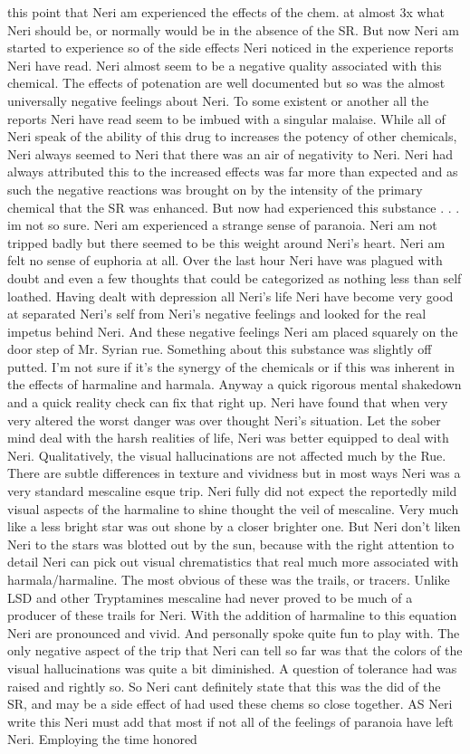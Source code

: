 \documentclass[12pt]{book}
\begin{document}
this point that Neri am experienced the effects of the chem. at almost 3x what Neri should be, or normally would be in the absence of the SR. But now Neri am started to experience so of the side effects Neri noticed in the experience reports Neri have read. Neri almost seem to be a negative quality associated with this chemical. The effects of potenation are well documented but so was the almost universally negative feelings about Neri. To some existent or another all the reports Neri have read seem to be imbued with a singular malaise. While all of Neri speak of the ability of this drug to increases the potency of other chemicals, Neri always seemed to Neri that there was an air of negativity to Neri. Neri had always attributed this to the increased effects was far more than expected and as such the negative reactions was brought on by the intensity of the primary chemical that the SR was enhanced. But now had experienced this substance . . .  im not so sure. Neri am experienced a strange sense of paranoia. Neri am not tripped badly but there seemed to be this weight around Neri's heart. Neri am felt no sense of euphoria at all. Over the last hour Neri have was plagued with doubt and even a few thoughts that could be categorized as nothing less than self loathed. Having dealt with depression all Neri's life Neri have become very good at separated Neri's self from Neri's negative feelings and looked for the real impetus behind Neri. And these negative feelings Neri am placed squarely on the door step of Mr. Syrian rue. Something about this substance was slightly off putted. I'm not sure if it's the synergy of the chemicals or if this was inherent in the effects of harmaline and harmala. Anyway a quick rigorous mental shakedown and a quick reality check can fix that right up. Neri have found that when very very altered the worst danger was over thought Neri's situation. Let the sober mind deal with the harsh realities of life, Neri was better equipped to deal with Neri. Qualitatively, the visual hallucinations are not affected much by the Rue. There are subtle differences in texture and vividness but in most ways Neri was a very standard mescaline esque trip. Neri fully did not expect the reportedly mild visual aspects of the harmaline to shine thought the veil of mescaline. Very much like a less bright star was out shone by a closer brighter one. But Neri don't liken Neri to the stars was blotted out by the sun, because with the right attention to detail Neri can pick out visual chrematistics that real much more associated with harmala/harmaline. The most obvious of these was the trails, or tracers. Unlike LSD and other Tryptamines mescaline had never proved to be much of a producer of these trails for Neri. With the addition of harmaline to this equation Neri are pronounced and vivid. And personally spoke quite fun to play with. The only negative aspect of the trip that Neri can tell so far was that the colors of the visual hallucinations was quite a bit diminished. A question of tolerance had was raised and rightly so. So Neri cant definitely state that this was the did of the SR, and may be a side effect of had used these chems so close together. AS Neri write this Neri must add that most if not all of the feelings of paranoia have left Neri. Employing the time honored 
\end{document}
